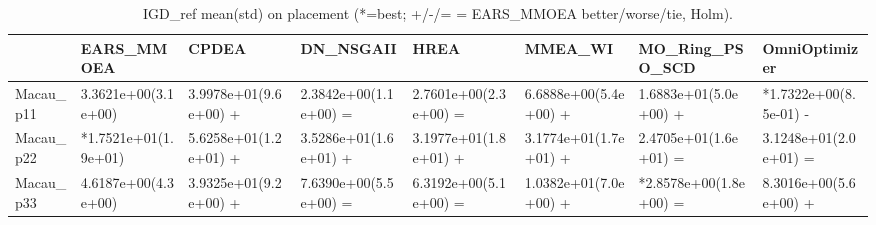 \begin{table}[t]
\centering
\caption{IGD_ref mean(std) on placement (*=best; +/-/= = EARS_MMOEA better/worse/tie, Holm).}
\label{tab:placement_IGD_ref}
\begin{tabular}{llllllll}
\toprule
 & EARS\_MMOEA & CPDEA & DN\_NSGAII & HREA & MMEA\_WI & MO\_Ring\_PSO\_SCD & OmniOptimizer \\
\midrule
Macau\_p11 & 3.3621e+00(3.1e+00) & 3.9978e+01(9.6e+00) + & 2.3842e+00(1.1e+00) = & 2.7601e+00(2.3e+00) = & 6.6888e+00(5.4e+00) + & 1.6883e+01(5.0e+00) + & *1.7322e+00(8.5e-01) - \\
Macau\_p22 & *1.7521e+01(1.9e+01) & 5.6258e+01(1.2e+01) + & 3.5286e+01(1.6e+01) + & 3.1977e+01(1.8e+01) + & 3.1774e+01(1.7e+01) + & 2.4705e+01(1.6e+01) = & 3.1248e+01(2.0e+01) = \\
Macau\_p33 & 4.6187e+00(4.3e+00) & 3.9325e+01(9.2e+00) + & 7.6390e+00(5.5e+00) = & 6.3192e+00(5.1e+00) = & 1.0382e+01(7.0e+00) + & *2.8578e+00(1.8e+00) = & 8.3016e+00(5.6e+00) + \\
\bottomrule
\end{tabular}
\end{table}
